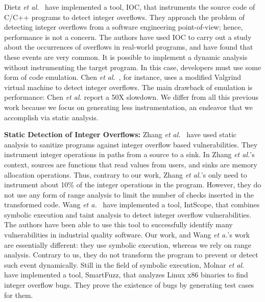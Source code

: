 \documentclass{sigplanconf}[10pt]
\begin{document}
Dietz {\em et al.}~\cite{Dietz12} have 
implemented a tool, IOC, that instruments the source code of C/C++ programs to
detect integer overflows.
They approach the problem of detecting integer overflows from a software
engineering point-of-view; hence, performance is not a concern.
The authors have used IOC to carry out a study about the occurrences
of overflows in real-world programs, and have found that these events are very
common.
It is possible to implement a dynamic analysis without instrumenting the
target program.
In this case, developers must use some form of code emulation.
Chen {\em et al.}~\cite{Chen09}, for instance, uses a modified
Valgrind~\cite{Nethercote07} virtual machine to detect integer overflows.
The main drawback of emulation is performance: Chen {\em et al.} report a
50X slowdown.
We differ from all this previous work because we focus on generating less
instrumentation, an endeavor that we accomplish via static analysis.

\noindent
\textbf{Static Detection of Integer Overflows: }
Zhang {\em et al.}~\cite{Zhang10} have used static analysis to sanitize
programs against integer overflow based vulnerabilities.
They instrument integer operations in paths from a source to a sink.
In Zhang {\em et al.}'s context, sources are functions that read values from
users, and sinks are memory allocation operations.
Thus, contrary to our work, Zhang {\em et al.}'s only need to instrument
about 10\% of the integer operations in the program.
However, they do not use any form of range analysis to limit the number of
checks inserted in the transformed code.
Wang {\em et a.}~\cite{Wang09} have implemented a tool, IntScope, that combines symbolic execution and taint analysis to detect integer overflow vulnerabilities. The authors have been able to use this tool to successfully identify many vulnerabilities in industrial quality software. Our work, and Wang {\em et a.}'s work are essentially different: they use symbolic execution, whereas we rely on
range analysis.
Contrary to us, they do not transform the program to prevent or detect such event dynamically.
Still in the field of symbolic execution, Molnar
{\em et al.}~\cite{Molnar09} have implemented a tool, SmartFuzz, that analyzes
Linux x86 binaries to find integer overflow bugs.
They prove the existence of bugs by generating test cases for them.
\end{document}
